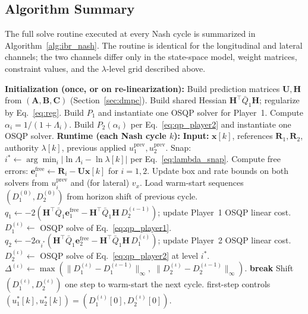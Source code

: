 \documentclass[12pt,a4paper,oneside]{report}
\begin{document}
\subsection{Algorithm Summary}
\label{sec:algorithm_summary}

The full solve routine executed at every Nash cycle is summarized in Algorithm~\ref{alg:ibr_nash}. The routine is identical for the longitudinal and lateral channels; the two channels differ only in the state-space model, weight matrices, constraint values, and the $\lambda$-level grid described above.

\begin{algorithm}[H]
\caption{Nash Equilibrium via Iterative Best Response with Pre-Computed $\lambda$ Grid}
\label{alg:ibr_nash}
\begin{algorithmic}[1]
\State \textbf{Initialization (once, or on re-linearization):}
\State Build prediction matrices $\mathbf{U}, \mathbf{H}$ from $(\mathbf{A}, \mathbf{B}, \mathbf{C})$ (Section~\ref{sec:dmpc}).
\State Build shared Hessian $\mathbf{H}^{\top} \bar{Q}_1 \mathbf{H}$; regularize by Eq.~\eqref{eq:reg}.
\State Build $P_1$ and instantiate one OSQP solver for Player~1.
    \State Compute $\alpha_i = 1/(1 + \Lambda_i)$.
    \State Build $P_2(\alpha_i)$ per Eq.~\eqref{eq:qp_player2} and instantiate one OSQP solver.
\EndFor
\State
\State \textbf{Runtime (each Nash cycle $k$):}
\State \textbf{Input:} $\mathbf{x}[k]$, references $\mathbf{R}_1, \mathbf{R}_2$, authority $\lambda[k]$, previous applied $u_1^{\text{prev}}, u_2^{\text{prev}}$.
\State Snap: $i^{*} \leftarrow \arg\min_i |\ln \Lambda_i - \ln \lambda[k]|$ per Eq.~\eqref{eq:lambda_snap}.
\State Compute free errors: $\mathbf{e}_i^{\text{free}} \leftarrow \mathbf{R}_i - \mathbf{U} \mathbf{x}[k]$ for $i = 1, 2$.
\State Update box and rate bounds on both solvers from $u_i^{\text{prev}}$ and (for lateral) $v_x$.
\State Load warm-start sequences $(D_1^{(0)}, D_2^{(0)})$ from horizon shift of previous cycle.
    \State $q_1 \leftarrow -2 (\mathbf{H}^{\top} \bar{Q}_1 \mathbf{e}_1^{\text{free}} - \mathbf{H}^{\top} \bar{Q}_1 \mathbf{H} \, D_2^{(\iota-1)})$; update Player~1 OSQP linear cost.
    \State $D_1^{(\iota)} \leftarrow$ OSQP solve of Eq.~\eqref{eq:qp_player1}.
    \State $q_2 \leftarrow -2 \alpha_{i^{*}} (\mathbf{H}^{\top} \bar{Q}_1 \mathbf{e}_2^{\text{free}} - \mathbf{H}^{\top} \bar{Q}_1 \mathbf{H} \, D_1^{(\iota)})$; update Player~2 OSQP linear cost.
    \State $D_2^{(\iota)} \leftarrow$ OSQP solve of Eq.~\eqref{eq:qp_player2} at level $i^{*}$.
    \State $\Delta^{(\iota)} \leftarrow \max(\|D_1^{(\iota)} - D_1^{(\iota-1)}\|_\infty, \; \|D_2^{(\iota)} - D_2^{(\iota-1)}\|_\infty)$.
     \textbf{break} \EndIf
\EndFor
\State Shift $(D_1^{(\iota)}, D_2^{(\iota)})$ one step to warm-start the next cycle.
\State \Return first-step controls $(u_1^{*}[k], u_2^{*}[k]) = (D_1^{(\iota)}[0], D_2^{(\iota)}[0])$.
\end{algorithmic}
\end{algorithm}
\end{document}
